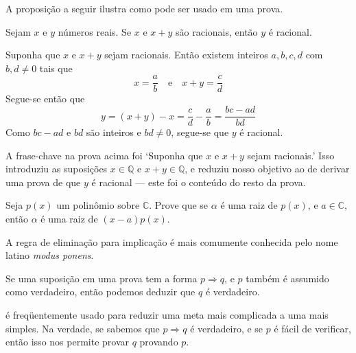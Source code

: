 \begin{itemizar}
A proposição a seguir ilustra como  pode ser usado em uma prova.

\begin{proposition}
\label{propRationalTwoOfThree}
Sejam $x$ e $y$ números reais. Se $x$ e $x+y$ são racionais, então $y$ é racional.
\end{proposition}

\begin{cproof}
Suponha que $x$ e $x+y$ sejam racionais. Então existem inteiros $a,b,c,d$ com $b,d \ne 0$ tais que
\[
x = \frac{a}{b} \quad \text{e} \quad x+y = \frac{c}{d}
\]
Segue-se então que
\[
y = (x+y)-x = \frac{c}{d}-\frac{a}{b} = \frac{bc-ad}{bd}
\]
Como $bc-ad$ e $bd$ são inteiros e $bd \ne 0$, segue-se que $y$ é racional.
\end{cproof}

A frase-chave na prova acima foi `Suponha que $x$ e $x+y$ sejam racionais.' Isso introduziu as suposições $x \in \mathbb{Q}$ e $x+y \in \mathbb{Q}$, e reduziu nosso objetivo ao de derivar uma prova de que $y$ é racional --- este foi o conteúdo do resto da prova.

\begin{exercise}
Seja $p(x)$ um polinômio sobre $\mathbb{C}$. Prove que se $\alpha$ é uma raiz de $p(x)$, e $a \in \mathbb{C}$, então $\alpha$ é uma raiz de $(x-a)p(x)$.
\end{exercise}

A regra de eliminação para implicação \elimrule{\Rightarrow} é mais comumente conhecida pelo nome latino \textit{modus ponens}.

\begin{strategy}
\label{strAssumingImplicationsDirect}
Se uma suposição em uma prova tem a forma $p \Rightarrow q$, e $p$ também é assumido como verdadeiro, então podemos deduzir que $q$ é verdadeiro.
\end{strategy}

 é freqüentemente usado para reduzir uma meta mais complicada a uma mais simples. Na verdade, se sabemos que $p \Rightarrow q$ é verdadeiro, e se $p$ é fácil de verificar, então isso nos permite provar $q$ provando $p$.


\end{itemizar}
